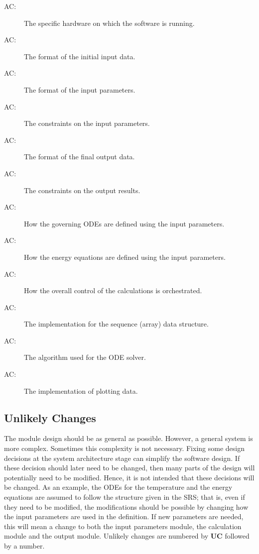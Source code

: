 \documentclass[12pt]{article}
\newcounter{acnum}
\newcommand{\actheacnum}{AC\theacnum}
\begin{document}
\begin{description}
\item[ \actheacnum \label{acHardware}:] The specific
  hardware on which the software is running.
\item[ \actheacnum \label{acInput}:] The format of the
  initial input data.
\item[ \actheacnum \label{acParams}:] The format of the
  input parameters.
\item[ \actheacnum \label{acVerify}:] The constraints on
  the input parameters.
\item[ \actheacnum \label{acOutput}:] The format of the
  final output data.
\item[ \actheacnum \label{acVerifyOut}:] The constraints on the output results.
\item[ \actheacnum \label{acODEs}:] How the governing ODEs
  are defined using the input parameters.
\item[ \actheacnum \label{acEnergy}:] How the energy
  equations are defined using the input parameters.
\item[ \actheacnum \label{acControl}:] How the overall
  control of the calculations is orchestrated.
\item[ \actheacnum \label{acSeqDS}:] The implementation
  for the sequence (array) data structure.
\item[ \actheacnum \label{acSolver}:] The algorithm used
  for the ODE solver.
\item[ \actheacnum \label{acPlot}:] The implementation of
  plotting data.
\end{description}

\subsection{Unlikely Changes} \label{SecUchange}

The module design should be as general as possible. However, a general system is
more complex. Sometimes this complexity is not necessary. Fixing some design
decisions at the system architecture stage can simplify the software design. If
these decision should later need to be changed, then many parts of the design
will potentially need to be modified. Hence, it is not intended that these
decisions will be changed.  As an example, the ODEs for the temperature and the
energy equations are assumed to follow the structure given in the SRS; that is,
even if they need to be modified, the modifications should be possible by
changing how the input parameters are used in the definition.  If new parameters
are needed, this will mean a change to both the input parameters module, the
calculation module and the output module. Unlikely changes are numbered by \textbf{UC} 
followed by a number.
\end{document}
